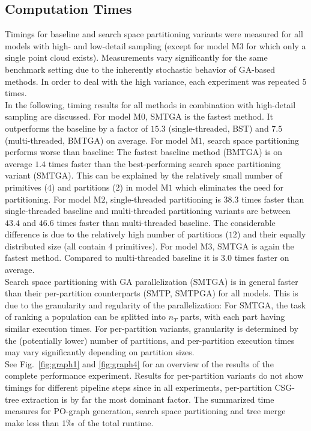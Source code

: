 \subsection{Computation Times}  
Timings for baseline and search space partitioning variants were measured for all models with high- and low-detail sampling (except for model M$3$ for which only a single point cloud exists).
Measurements vary significantly for the same benchmark setting due to the inherently stochastic behavior of \ac{GA}-based methods. 
In order to deal with the high variance, each experiment was repeated $5$ times.
\\
In the following, timing results for all methods in combination with high-detail sampling are discussed.
For model M$0$, SMTGA is the fastest method. 
It outperforms the baseline by a factor of $15.3$ (single-threaded, BST) and $7.5$ (multi-threaded, BMTGA) on average.
For model M$1$, search space partitioning performs worse than baseline: 
The fastest baseline method (BMTGA) is on average $1.4$ times faster than the best-performing search space partitioning variant (SMTGA).
This can be explained by the relatively small number of primitives ($4$) and partitions ($2$) in model M$1$ which eliminates the need for partitioning.
For model M$2$, single-threaded partitioning is $38.3$ times faster than single-threaded baseline and multi-threaded partitioning variants are between $43.4$ and $46.6$ times faster than multi-threaded baseline.  
The considerable difference is due to the relatively high number of partitions ($12$) and their equally distributed size (all contain $4$ primitives).
For model M$3$, SMTGA is again the fastest method. 
Compared to multi-threaded baseline it is $3.0$ times faster on average.
\\
Search space partitioning with \ac{GA} parallelization (SMTGA) is in general faster than their per-partition counterparts (SMTP, SMTPGA) for all models.
This is due to the granularity and regularity of the parallelization: 
For SMTGA, the task of ranking a population can be splitted into $n_T$ parts, with each part having similar execution times.
For per-partition variants, granularity is determined by the (potentially lower) number of partitions, and per-partition execution times may vary significantly depending on partition sizes. 
\\
See Fig.~\ref{fig:graph1} and \ref{fig:graph4} for an overview of the results of the complete performance experiment.
Results for per-partition variants do not show timings for different pipeline steps since in all experiments, per-partition \ac{CSG}-tree extraction is by far the most dominant factor. 
The summarized time measures for \ac{PO}-graph generation, search space partitioning and tree merge make less than $1\permil$ of the total runtime.
